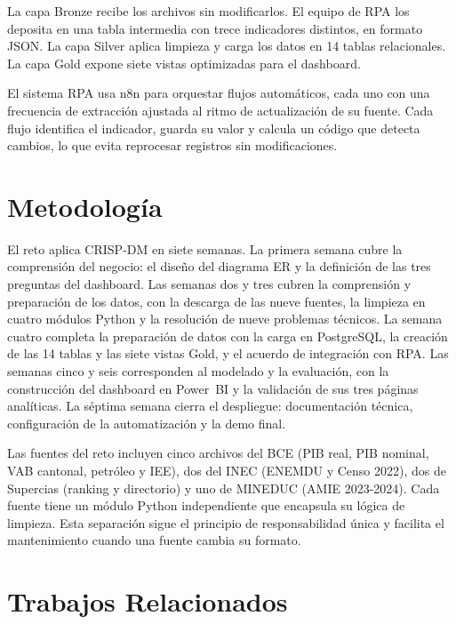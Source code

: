\documentclass[10pt,twocolumn,spanish]{IEEEtran}
\begin{document}
La capa Bronze recibe los archivos sin modificarlos. El equipo de
RPA los deposita en una tabla intermedia con trece indicadores
distintos, en formato JSON. La capa Silver aplica limpieza y carga
los datos en 14 tablas relacionales. La capa Gold expone siete
vistas optimizadas para el dashboard.

El sistema RPA usa n8n para orquestar flujos automáticos, cada uno
con una frecuencia de extracción ajustada al ritmo de actualización
de su fuente. Cada flujo identifica el indicador, guarda su valor y
calcula un código que detecta cambios, lo que evita reprocesar
registros sin modificaciones.

\section{Metodología}

El reto aplica CRISP-DM en siete semanas.
La primera semana cubre la comprensión del negocio: el diseño del
diagrama ER y la definición de las tres preguntas del dashboard.
Las semanas dos y tres cubren la comprensión y preparación de los
datos, con la descarga de las nueve fuentes, la limpieza en cuatro
módulos Python y la resolución de nueve problemas técnicos.
La semana cuatro completa la preparación de datos con la carga en
PostgreSQL, la creación de las 14 tablas y las siete vistas Gold, y
el acuerdo de integración con RPA.
Las semanas cinco y seis corresponden al modelado y la evaluación,
con la construcción del dashboard en Power~BI y la validación de
sus tres páginas analíticas.
La séptima semana cierra el despliegue: documentación técnica,
configuración de la automatización y la demo final.

Las fuentes del reto incluyen cinco archivos del BCE (PIB real, PIB
nominal, VAB cantonal, petróleo y IEE), dos del INEC (ENEMDU y Censo
2022), dos de Supercias (ranking y directorio) y uno de MINEDUC
(AMIE 2023-2024). Cada fuente tiene un módulo Python independiente
que encapsula su lógica de limpieza. Esta separación sigue el
principio de responsabilidad única y facilita el mantenimiento cuando
una fuente cambia su formato.

\section{Trabajos Relacionados}
\end{document}
